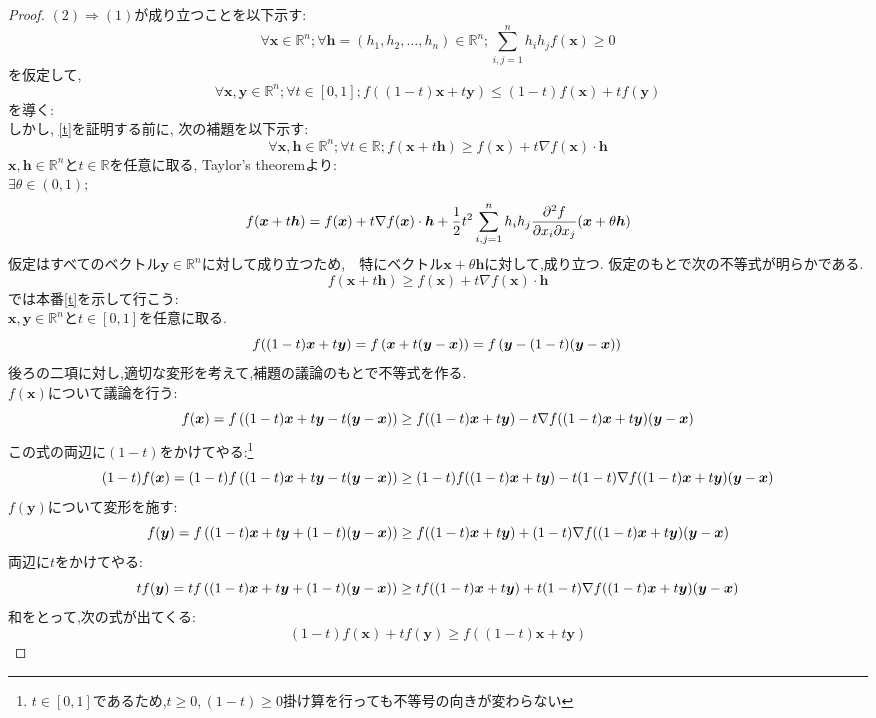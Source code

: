 \documentclass[dvipdfmx]{jsarticle}
\begin{document}
\begin{proof}
	$(2) \Rightarrow (1)$が成り立つことを以下示す:
	\begin{equation}
		\forall \bm{x} \in \mathbb{R}^n ; \forall \bm{h} = (h_1 ,h_2 , \ldots , h_n) \in \mathbb{R}^n ; \sum\limits_{i,j =1}^n h_i h_j f(\bm{x}) \ge 0 
	\end{equation}
	を仮定して,
	\begin{equation}
		\forall \bm{x} , \bm{y} \in \mathbb{R}^n ; \forall t \in [0,1]; f((1-t)\bm{x} +t \bm{y}) \le (1-t)f(\bm{x}) + t f(\bm{y}) \label{t} 
	\end{equation}
	を導く:\\
	しかし, \ref{t}を証明する前に, 次の補題を以下示す:
	\begin{equation}
		\forall \bm{x} , \bm{h} \in \mathbb{R}^n ; \forall t \in \mathbb{R}; f(\bm{x} + t \bm{h}) \ge  f(\bm{x}) + t \nabla f(\bm{x}) \cdot \bm{h}
	\end{equation}
	$\bm{x}, \bm{h} \in \mathbb{R}^n $と$ t \in \mathbb{R}$を任意に取る, Taylor's theoremより:\\
		$	\exists \theta \in (0,1);$ \\
		$$
			f(\bm{x} + t\bm{h}) = f(\bm{x}) + t \nabla f(\bm{x})\cdot \bm{h} + \frac{1}{2} t^2 \sum_{i,j =1}^n h_i h_j \frac{\partial^2 f}{\partial x_i \partial x_j}(\bm{x} + \theta \bm{h})\\
		$$
		仮定はすべてのベクトル$ \bm{y} \in \mathbb{R}^n$に対して成り立つため,　特にベクトル$\bm{x} + \theta \bm{h}$に対して,成り立つ. 仮定のもとで次の不等式が明らかである.
		$$
		f(\bm{x} + t\bm{h}) \ge f(\bm{x}) + t \nabla f(\bm{x})\cdot \bm{h}
		$$
	では本番\ref{t}を示して行こう:\\
	$ \bm{x}, \bm{y} \in \mathbb{R}^n $と$t \in [0,1]$を任意に取る. 
			$$
			f((1-t)\bm{x} + t \bm{y}) = f\left( \bm{x} + t( \bm{y} - \bm{x}) \right) = f\left(\bm{y} - (1-t)(\bm{y} - \bm{x})\right) \\
			$$
			後ろの二項に対し,適切な変形を考えて,補題の議論のもとで不等式を作る.\\
			$f(\bm{x})$について議論を行う:
			$$
			f(\bm{x}) = f\left( (1-t)\bm{x} + t \bm{y} -t( \bm{y} - \bm{x})\right) \ge f((1-t)\bm{x} + t \bm{y}) - t\nabla f((1-t)\bm{x} + t \bm{y}) (\bm{y}- \bm{x})\\
			$$
			この式の両辺に$(1-t)$をかけてやる:\footnote{$t \in [0,1]$であるため,$t \ge 0 ,(1-t) \ge 0$掛け算を行っても不等号の向きが変わらない}
			$$
			(1-t)f(\bm{x}) = (1-t)f\left( (1-t)\bm{x} + t \bm{y} -t( \bm{y} - \bm{x}) \right) \ge (1-t)f((1-t)\bm{x} + t \bm{y}) - t(1-t)\nabla f((1-t)\bm{x} + t \bm{y}) (\bm{y}- \bm{x})\\
			$$
			$f(\bm{y})$について変形を施す:
			$$
			f(\bm{y}) = f\left( (1-t)\bm{x} + t \bm{y} + (1-t)(\bm{y} - \bm{x}) \right) \ge f((1-t)\bm{x} + t \bm{y}) + (1-t)\nabla f((1-t)\bm{x} + t \bm{y}) (\bm{y}- \bm{x})\\
			$$
			両辺に$t$をかけてやる:
			$$
			tf(\bm{y}) = tf\left( (1-t)\bm{x} + t \bm{y} + (1-t)(\bm{y} - \bm{x})\right) \ge tf((1-t)\bm{x} + t \bm{y}) + t(1-t)\nabla f((1-t)\bm{x} + t \bm{y}) (\bm{y}- \bm{x})\\
			$$
			和をとって,次の式が出てくる:
			$$
			(1-t)f(\bm{x}) + t f(\bm{y}) \ge f((1-t)\bm{x} + t \bm{y})
			$$
\end{proof}
\end{document}
